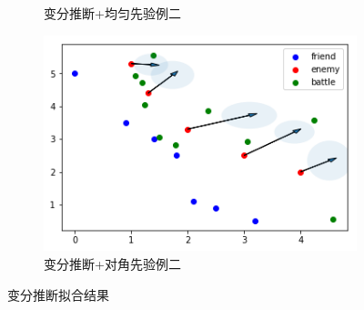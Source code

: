 \documentclass{sicnuthesis}
\begin{document}
\begin{figure}[htb]
\begin{subfigure}[b]{0.45\linewidth}
    \caption{变分推断+均匀先验例二}
  \end{subfigure}
  \begin{subfigure}[b]{0.45\linewidth}
    \includegraphics[width=\linewidth]{VI22.png}
    \caption{变分推断+对角先验例二}
  \end{subfigure}
  \caption{变分推断拟合结果}
  \label{fig:VI}
\end{figure}
\end{document}
